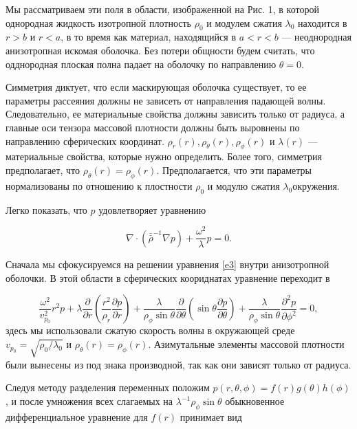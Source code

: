 \documentclass[a4paper, 12pt]{article}
\newcommand{\dbar}[1]{\bar{\bar{#1}}}
\begin{document}
Мы рассматриваем эти поля в области, изображенной на Рис. 1, в которой
однородная жидкость изотропной плотность $\rho_0$ и модулем сжатия
$\lambda_0$ находится в $r>b$ и $r<a$, в то время как материал, находящийся в
 $a<r<b$ --- неоднородная анизотропная искомая оболочка. Без потери общности будем 
 считать, что одднородная плоская полна падает на оболочку
  по направлению $\theta=0$.

 Симметрия диктует, что если маскирующая оболочка существует, то ее параметры
 рассеяния должны не зависеть от направления падающей волны. Следовательно, 
 ее материальные свойства должны зависить только от радиуса, а главные оси
 тензора массовой плотности должны быть выровнены по направлению сферических
 координат. $\rho_r(r), \rho_\theta(r), \rho_\phi(r)$ и $\lambda(r)$ --- 
 материальные свойства, которые нужно определить. Более того, симметрия 
 предполагает, что $\rho_\theta(r)=\rho_\phi(r)$. Предполагается, что эти параметры
 нормализованы по отношению к плостности $\rho_0$ и модулю сжатия $\lambda_0$окружения.

 Легко показать, что $p$ удовлетворяет уравнению 

 \begin{equation}\label{e3}
 	\nabla \cdot (\dbar{\rho}^{-1}\nabla p) + \frac{\omega^2}{\lambda}p=0.
 \end{equation}

 Сначала мы сфокусируемся на решении уравнения \eqref{e3} внутри анизотропной
 оболочки. В этой области в сферических коориднатах уравнение переходит в

 \begin{equation}
 		\frac{\omega^2}{v^2_{p_0}} r^2p+ \lambda \frac{\partial}{\partial r}
 		\left( \frac{r^2}{\rho_r} \frac{\partial p}{\partial r} \right) +
 		\frac{\lambda}{\rho_\phi\sin\theta}\frac{\partial}{\partial\theta}
 		\left( \sin\theta \frac{\partial p}{\partial \theta}\right) +
 		\frac{\lambda}{\rho_\phi\sin\theta} \frac{\partial^2 p}{\partial\phi^2}=0,
 \end{equation}
 здесь мы использовали сжатую скорость волны в окружающей среде
 $v_{p_0}=\sqrt{\rho_0/\lambda_0}$ и $\rho_\theta(r)=\rho_\phi(r)$.
 Азимутальные элементы массовой плотности были вынесены из под знака производной,
 так как они зависят только от радиуса.

 Следуя методу разделения переменных положим 
 $p(r,\theta,\phi)=f(r)g(\theta)h(\phi)$, и после умножения всех слагаемых
 на $\lambda^{-1}\rho_\phi\sin\theta$ обыкновенное дифференциальное уравнение
 для $f(r)$ принимает вид 
\end{document}
